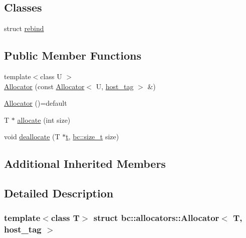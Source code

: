 \subsection*{Classes}
\begin{DoxyCompactItemize}
\item 
struct \hyperlink{structbc_1_1allocators_1_1Allocator_3_01T_00_01host__tag_01_4_1_1rebind}{rebind}
\end{DoxyCompactItemize}
\subsection*{Public Member Functions}
\begin{DoxyCompactItemize}
\item 
{\footnotesize template$<$class U $>$ }\\\hyperlink{structbc_1_1allocators_1_1Allocator_3_01T_00_01host__tag_01_4_ab3c8ab0bb3be8497097288b6164c3549}{Allocator} (const \hyperlink{classbc_1_1allocators_1_1Allocator}{Allocator}$<$ U, \hyperlink{structbc_1_1host__tag}{host\+\_\+tag} $>$ \&)
\item 
\hyperlink{structbc_1_1allocators_1_1Allocator_3_01T_00_01host__tag_01_4_a74632d8f2485cc5fbbc1942674263ecd}{Allocator} ()=default
\item 
T $\ast$ \hyperlink{structbc_1_1allocators_1_1Allocator_3_01T_00_01host__tag_01_4_a7dc1bfcee83cc2986902722308a0a180}{allocate} (int size)
\item 
void \hyperlink{structbc_1_1allocators_1_1Allocator_3_01T_00_01host__tag_01_4_a57811db93d9898bedf13ea7abd9fa1b9}{deallocate} (T $\ast$\hyperlink{expression__operations_8h_aaf23b70530701962855e4abdeea019a2}{t}, \hyperlink{namespacebc_aaf8e3fbf99b04b1b57c4f80c6f55d3c5}{bc\+::size\+\_\+t} size)
\end{DoxyCompactItemize}
\subsection*{Additional Inherited Members}


\subsection{Detailed Description}
\subsubsection*{template$<$class T$>$\newline
struct bc\+::allocators\+::\+Allocator$<$ T, host\+\_\+tag $>$}


